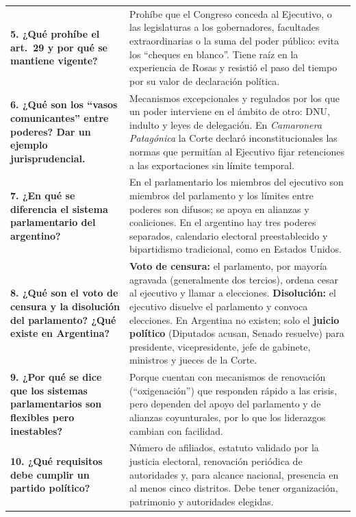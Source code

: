 \documentclass[12pt,oneside]{book}
\begin{document}
\begin{longtable}{
    >{\raggedright\arraybackslash}p{}
    >{\raggedright\arraybackslash}p{}
}
\textbf{5. ¿Qué prohíbe el art.\ 29 y por qué se mantiene vigente?} &
Prohíbe que el Congreso conceda al Ejecutivo, o las legislaturas a los gobernadores, facultades extraordinarias o la suma del poder público: evita los ``cheques en blanco''. Tiene raíz en la experiencia de Rosas y resistió el paso del tiempo por su valor de declaración política. \\

\textbf{6. ¿Qué son los ``vasos comunicantes'' entre poderes? Dar un ejemplo jurisprudencial.} &
Mecanismos excepcionales y regulados por los que un poder interviene en el ámbito de otro: DNU, indulto y leyes de delegación. En \emph{Camaronera Patagónica} la Corte declaró inconstitucionales las normas que permitían al Ejecutivo fijar retenciones a las exportaciones sin límite temporal. \\

\textbf{7. ¿En qué se diferencia el sistema parlamentario del argentino?} &
En el parlamentario los miembros del ejecutivo son miembros del parlamento y los límites entre poderes son difusos; se apoya en alianzas y coaliciones. En el argentino hay tres poderes separados, calendario electoral preestablecido y bipartidismo tradicional, como en Estados Unidos. \\

\textbf{8. ¿Qué son el voto de censura y la disolución del parlamento? ¿Qué existe en Argentina?} &
\textbf{Voto de censura:} el parlamento, por mayoría agravada (generalmente dos tercios), ordena cesar al ejecutivo y llamar a elecciones. \textbf{Disolución:} el ejecutivo disuelve el parlamento y convoca elecciones. En Argentina no existen; solo el \textbf{juicio político} (Diputados acusan, Senado resuelve) para presidente, vicepresidente, jefe de gabinete, ministros y jueces de la Corte. \\

\textbf{9. ¿Por qué se dice que los sistemas parlamentarios son flexibles pero inestables?} &
Porque cuentan con mecanismos de renovación (``oxigenación'') que responden rápido a las crisis, pero dependen del apoyo del parlamento y de alianzas coyunturales, por lo que los liderazgos cambian con facilidad. \\

\textbf{10. ¿Qué requisitos debe cumplir un partido político?} &
Número de afiliados, estatuto validado por la justicia electoral, renovación periódica de autoridades y, para alcance nacional, presencia en al menos cinco distritos. Debe tener organización, patrimonio y autoridades elegidas. \\


\end{longtable}
\end{document}

